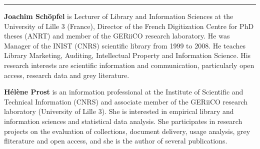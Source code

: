 \begin{center}\rule{0.5\linewidth}{\linethickness}\end{center}

\textbf{Joachim Schöpfel} is Lecturer of Library and Information
Sciences at the University of Lille 3 (France), Director of the French
Digitization Centre for PhD theses (ANRT) and member of the GERiiCO
research laboratory. He was Manager of the INIST (CNRS) scientific
library from 1999 to 2008. He teaches Library Marketing, Auditing,
Intellectual Property and Information Science. His research interests
are scientific information and communication, particularly open access,
research data and grey literature.

\textbf{Hélène Prost} is an information professional at the Institute of
Scientific and Technical Information (CNRS) and associate member of the
GERiiCO research laboratory (University of Lille 3). She is interested
in empirical library and information sciences and statistical data
analysis. She participates in research projects on the evaluation of
collections, document delivery, usage analysis, grey fliterature and
open access, and she is the author of several publications.
